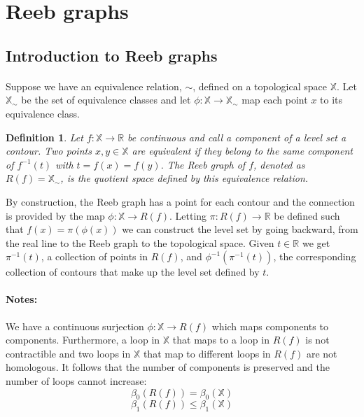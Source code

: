 \documentclass[]{article}
\newtheorem{definition}{Definition}
\newcommand{\R}{\mathbb{R}}
\newcommand{\X}{\mathbb{X}}
\begin{document}
\section{Reeb graphs}
     \subsection{Introduction to Reeb graphs}
     \paragraph{}
      Suppose we have an equivalence relation, $\sim$, defined on a topological space $\X$. Let $\X_\sim$
      be the set of equivalence classes and let $\phi : \X \to \X_\sim$ map each point $x$ to its equivalence class.

\begin{definition}
      Let $f: \X \to \R$ be continuous and call a component of a level set a contour. Two
      points $x,y \in \X$ are equivalent if they belong to the same component of $f^{-1}(t)$
      with $t=f(x)=f(y)$. The Reeb graph of $f$, denoted as $R(f)=\X_\sim$, is the quotient space 
      defined by this equivalence relation.
  \end{definition}
      By construction, the Reeb graph has a point for each contour and the connection is 
      provided by the map $\phi:\X\to R(f)$. Letting $\pi:R(f)\to\R$ be defined such that $f(x)=\pi(\phi(x))$
      we can construct the level set by going backward, from the real line to the Reeb graph to the 
      topological space. Given $t\in\R$ we get $\pi^{-1}(t)$, a collection of points in $R(f)$,
      and $\phi^{-1}(\pi^{-1}(t))$, the corresponding collection of contours that make up the level set defined by $t$.

      \paragraph{Notes:}We have a continuous surjection $\phi:\X\to R(f)$ which maps components 
      to components. Furthermore, a loop in $\X$ that maps to a loop in $R(f)$ is not contractible
      and two loops in $\X$ that map to different loops in $R(f)$ are not homologous. It follows
      that the number of components is preserved and the number of loops cannot increase:
      $$
      \beta_0(R(f))=\beta_0(\X)
      $$
      $$
      \beta_1(R(f))\le\beta_1(\X)
      $$

\end{document}
